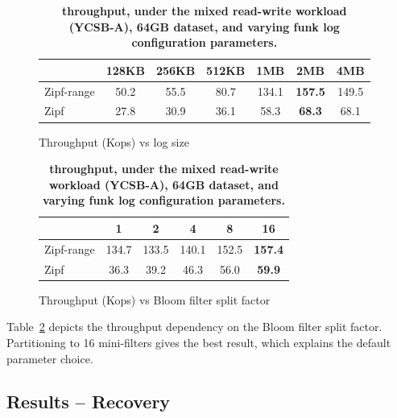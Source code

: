 \begin{table}
\centering
\begin{subfigure}{0.55\linewidth}
{\small{
\begin{tabular}{|l|c|c|c|c|c|c|}
\hline 
& 128KB & 256KB & 512KB & 1MB & 2MB & 4MB\\
\hline 
Zipf-range & 50.2	& 55.5 & 80.7	& 134.1 & {\bf {157.5}} & 149.5 \\
Zipf & 27.8	& 30.9 & 36.1	& 58.3	& {\bf {68.3}}	& 68.1 \\
\hline
\end{tabular}
}}
\caption{Throughput (Kops) vs log size}
\label{fig:wal:sz}
\end{subfigure}
\begin{subfigure}{0.35\linewidth}
{\small{
\begin{tabular}{|l|c|c|c|c|c|}
\hline 
& 1 & 2 & 4 & 8 & 16\\
\hline 
Zipf-range & 134.7 & 133.5 & 140.1 & 152.5 & {\bf {157.4}} \\
Zipf & 36.3 & 39.2 & 46.3 & 56.0 & {\bf {59.9}} \\
\hline 
\end{tabular}
}}
\caption{Throughput (Kops) vs Bloom filter split factor}
\label{fig:wal:bf}
\end{subfigure}
\caption{\bf{\sys\/ throughput, under the mixed read-write workload (YCSB-A), 64GB dataset, and varying funk log configuration parameters.}}
\label{fig:wal}
\end{table}

Table~\ref{fig:wal:bf} depicts the throughput dependency on the Bloom filter split factor. 
Partitioning to 16 mini-filters gives the best result, which explains the default parameter choice. 

\subsection{Results -- Recovery}